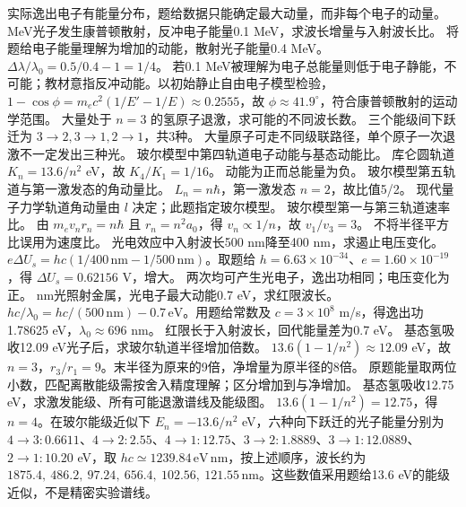 \crosscheck 实际逸出电子有能量分布，题给数据只能确定最大动量，而非每个电子的动量。
 MeV光子发生康普顿散射，反冲电子能量0.1 MeV，求波长增量与入射波长比。
\workings 将题给电子能量理解为增加的动能，散射光子能量0.4 MeV。$\Delta\lambda/\lambda_0=0.5/0.4-1=1/4$。
\crosscheck 若0.1 MeV被理解为电子总能量则低于电子静能，不可能；教材意指反冲动能。以初始静止自由电子模型检验，$1-\cos\phi=m_ec^2(1/E'-1/E)\approx0.2555$，故 $\phi\approx41.9^\circ$，符合康普顿散射的运动学范围。
\problemtext 大量处于 $n=3$ 的氢原子退激，求可能的不同波长数。
\workings 三个能级间下跃迁为 $3\to2,3\to1,2\to1$，共3种。
\crosscheck 大量原子可走不同级联路径，单个原子一次退激不一定发出三种光。
\problemtext 玻尔模型中第四轨道电子动能与基态动能比。
\workings 库仑圆轨道 $K_n=13.6/n^2$ eV，故 $K_4/K_1=1/16$。
\crosscheck 动能为正而总能量为负。
\problemtext 玻尔模型第五轨道与第一激发态的角动量比。
\workings $L_n=n\hbar$，第一激发态 $n=2$，故比值5/2。
\crosscheck 现代量子力学轨道角动量由 $l$ 决定；此题指定玻尔模型。
\problemtext 玻尔模型第一与第三轨道速率比。
\workings 由 $m_ev_nr_n=n\hbar$ 且 $r_n=n^2a_0$，得 $v_n\propto1/n$，故 $v_1/v_3=3$。
\crosscheck 不将半径平方比误用为速度比。
\problemtext 光电效应中入射波长500 nm降至400 nm，求遏止电压变化。
\workings $e\Delta U_s=hc(1/400\,\mathrm{nm}-1/500\,\mathrm{nm})$。取题给 $h=6.63\times10^{-34}$、$e=1.60\times10^{-19}$，得 $\Delta U_s=0.62156$ V，增大。
\crosscheck 两次均可产生光电子，逸出功相同；电压变化为正。
 nm光照射金属，光电子最大动能0.7 eV，求红限波长。
\workings $hc/\lambda_0=hc/(500\,\mathrm{nm})-0.7\,\mathrm{eV}$。用题给常数及 $c=3\times10^8$ m/s，得逸出功1.78625 eV，$\lambda_0\approx696$ nm。
\crosscheck 红限长于入射波长，回代能量差为0.7 eV。
\problemtext 基态氢吸收12.09 eV光子后，求玻尔轨道半径增加倍数。
\workings $13.6(1-1/n^2)\approx12.09$ eV，故 $n=3$，$r_3/r_1=9$。末半径为原来的9倍，净增量为原半径的8倍。
\crosscheck 原题能量取两位小数，匹配离散能级需按舍入精度理解；区分增加到与净增加。
\problemtext 基态氢吸收12.75 eV，求激发能级、所有可能退激谱线及能级图。
\workings $13.6(1-1/n^2)=12.75$，得 $n=4$。在玻尔能级近似下 $E_n=-13.6/n^2$ eV，六种向下跃迁的光子能量分别为 $4\to3:0.6611$、$4\to2:2.55$、$4\to1:12.75$、$3\to2:1.8889$、$3\to1:12.0889$、$2\to1:10.20$ eV，取 $hc\simeq1239.84\,\mathrm{eV\,nm}$，按上述顺序，波长约为 $1875.4,\ 486.2,\ 97.24,\ 656.4,\ 102.56,\ 121.55\,\mathrm{nm}$。这些数值采用题给13.6 eV的能级近似，不是精密实验谱线。
